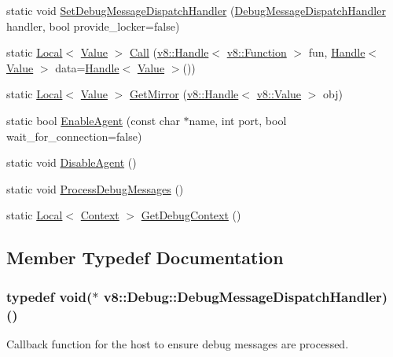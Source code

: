 \begin{DoxyCompactItemize}
\item 
static void \hyperlink{classv8_1_1_debug_a5147f6cfeb9b87a67630b8c959996e9c}{Set\+Debug\+Message\+Dispatch\+Handler} (\hyperlink{classv8_1_1_debug_a91cd8aa9743e3478bc63fe73abcd557c}{Debug\+Message\+Dispatch\+Handler} handler, bool provide\+\_\+locker=false)
\item 
static \hyperlink{classv8_1_1_local}{Local}$<$ \hyperlink{classv8_1_1_value}{Value} $>$ \hyperlink{classv8_1_1_debug_a49a3e0cf585cfd201d8ab1bc395d0593}{Call} (\hyperlink{classv8_1_1_handle}{v8\+::\+Handle}$<$ \hyperlink{classv8_1_1_function}{v8\+::\+Function} $>$ fun, \hyperlink{classv8_1_1_handle}{Handle}$<$ \hyperlink{classv8_1_1_value}{Value} $>$ data=\hyperlink{classv8_1_1_handle}{Handle}$<$ \hyperlink{classv8_1_1_value}{Value} $>$())
\item 
static \hyperlink{classv8_1_1_local}{Local}$<$ \hyperlink{classv8_1_1_value}{Value} $>$ \hyperlink{classv8_1_1_debug_aa7d07c7d5c9ee2eaaa9af310bcbf58f5}{Get\+Mirror} (\hyperlink{classv8_1_1_handle}{v8\+::\+Handle}$<$ \hyperlink{classv8_1_1_value}{v8\+::\+Value} $>$ obj)
\item 
static bool \hyperlink{classv8_1_1_debug_a78506e80b599010624c5fcde72a643a7}{Enable\+Agent} (const char $\ast$name, int port, bool wait\+\_\+for\+\_\+connection=false)
\item 
static void \hyperlink{classv8_1_1_debug_aa9b8f5fe4545f52f5937d61e972dcbf0}{Disable\+Agent} ()
\item 
static void \hyperlink{classv8_1_1_debug_a888e06766caee0380c6aa010b00e1a54}{Process\+Debug\+Messages} ()
\item 
static \hyperlink{classv8_1_1_local}{Local}$<$ \hyperlink{classv8_1_1_context}{Context} $>$ \hyperlink{classv8_1_1_debug_a2343a321b0db41324b7e8a7402f57cf0}{Get\+Debug\+Context} ()
\end{DoxyCompactItemize}


\subsection{Member Typedef Documentation}
\hypertarget{classv8_1_1_debug_a91cd8aa9743e3478bc63fe73abcd557c}{}
\subsubsection[{Debug\+Message\+Dispatch\+Handler}]{\setlength{\rightskip}{0pt plus 5cm}typedef void($\ast$ v8\+::\+Debug\+::\+Debug\+Message\+Dispatch\+Handler) ()}\label{classv8_1_1_debug_a91cd8aa9743e3478bc63fe73abcd557c}
Callback function for the host to ensure debug messages are processed. \hypertarget{classv8_1_1_debug_a4be52510b70764b730dd1289bd9bbe37}{}

